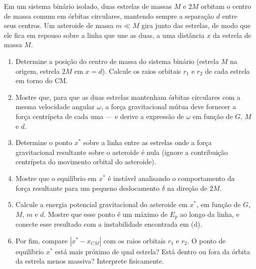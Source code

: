\begin{exemplo}\label{exemplo_gravitacao_energiapotencialgravitacionalex03}

Em um sistema binário isolado, duas estrelas de massas $M$ e
$2M$ orbitam o centro de massa comum em órbitas circulares, mantendo
sempre a separação $d$ entre seus centros. Um asteroide de massa
$m \ll M$ gira junto das estrelas, de modo que ele fica em repouso sobre a linha que une as duas, a
uma distância $x$ da estrela de massa $M$.

\begin{enumerate}

  \item[a)] Determine a posição do centro de massa do sistema binário
  (estrela $M$ na origem, estrela $2M$ em $x = d$). Calcule os raios
  orbitais $r_1$ e $r_2$ de cada estrela em torno do CM.

  \item[b)] Mostre que, para que as duas estrelas mantenham órbitas
  circulares com a mesma velocidade angular $\omega$, a força
  gravitacional mútua deve fornecer a força centrípeta de cada uma
  --- e derive a expressão de $\omega$ em função de $G$, $M$ e $d$.

  \item[c)] Determine o ponto $x^*$ sobre a linha entre as estrelas onde 
a força gravitacional resultante sobre o asteroide é nula (ignore a 
contribuição centrípeta do movimento orbital do asteroide).

  \item[d)] Mostre que o equilíbrio em $x^*$ é instável analisando o
  comportamento da força resultante para um pequeno deslocamento
  $\delta$ na direção de $2M$.

  \item[e)] Calcule a energia potencial gravitacional do asteroide em
  $x^*$, em função de $G$, $M$, $m$ e $d$. Mostre que esse ponto é
  um máximo de $E_p$ ao longo da linha, e conecte esse resultado com
  a instabilidade encontrada em (d).

  \item[f)] Por fim, compare $|x^* - x_{CM}|$ com os raios orbitais
  $r_1$ e $r_2$. O ponto de equilíbrio $x^*$ está mais próximo de
  qual estrela? Está dentro ou fora da órbita da estrela menos
  massiva? Interprete fisicamente.

\end{enumerate}



\resolucao


\end{exemplo}
